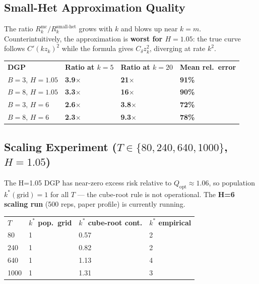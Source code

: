 \documentclass[11pt,a4paper]{article}
\newcommand{\pa}[1]{\textcolor{myamber}{\textbf{#1}}}
\newcommand{\no}[1]{\textcolor{myred}{\textbf{#1}}}
\newcommand{\kstar}{k^*}
\newcommand{\Cdelta}{C_{\delta}}
\newcommand{\zk}{z_k}
\begin{document}
\subsection{Small-Het Approximation Quality}

The ratio \(R_k^{\mathrm{mc}}/R_k^{\mathrm{small\text{-}het}}\) grows with \(k\) and blows up near \(k=m\).
Counterintuitively, the approximation is \textbf{worst for \(H=1.05\)}:
the true curve follows \(C'(k\zk)^2\) while the formula gives \(\Cdelta\zk^2\), diverging at rate \(k^2\).

\smallskip
\begin{tabular}{L{2.8cm} C{2.0cm} C{2.0cm} C{2.5cm}}
\color{white}\bfseries DGP &
\color{white}\bfseries Ratio at \(k=5\) &
\color{white}\bfseries Ratio at \(k=20\) &
\color{white}\bfseries Mean rel.\ error \\
\(B{=}3,\,H{=}1.05\) & \no{3.9\(\times\)} & \no{21\(\times\)} & \no{91\%} \\
\(B{=}8,\,H{=}1.05\) & \no{3.3\(\times\)} & \no{16\(\times\)} & \no{90\%} \\
\(B{=}3,\,H{=}6\) & \pa{2.6\(\times\)} & \pa{3.8\(\times\)} & \pa{72\%} \\
\(B{=}8,\,H{=}6\) & \pa{2.3\(\times\)} & \pa{9.3\(\times\)} & \pa{78\%} \\
\end{tabular}

\subsection{Scaling Experiment (\(T\in\{80,240,640,1000\}\), \(H=1.05\))}

The H=1.05 DGP has near-zero excess risk relative to \(Q_{\mathrm{opt}}\approx1.06\),
so population \(\kstar(\text{grid})=1\) for all \(T\) — the cube-root rule is not operational.
The \textbf{H=6 scaling run} (500 reps, paper profile) is currently running.

\smallskip
\begin{tabular}{C{1.2cm} C{2.0cm} C{2.5cm} C{2.2cm}}
\color{white}\bfseries \(T\) &
\color{white}\bfseries \(\kstar\) pop.\ grid &
\color{white}\bfseries \(\kstar\) cube-root cont. &
\color{white}\bfseries \(\kstar\) empirical \\
 80   & 1 & 0.57 & 2 \\
240  & 1 & 0.82 & 2 \\
 640  & 1 & 1.13 & 4 \\
1000 & 1 & 1.31 & 3 \\
\end{tabular}
\end{document}
